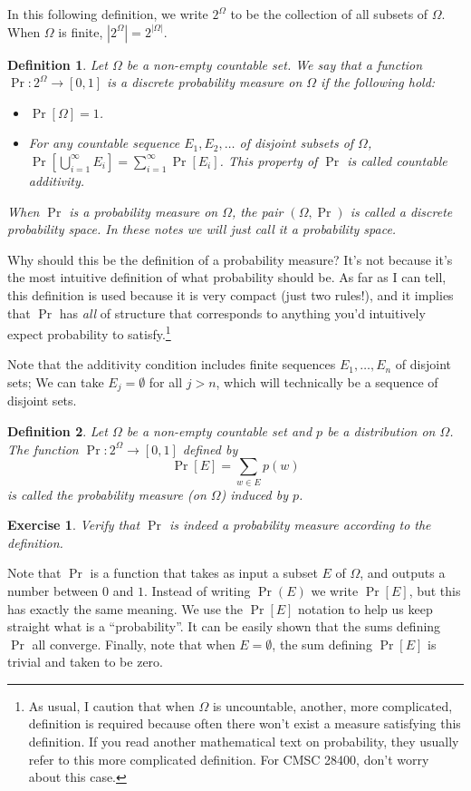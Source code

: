 \documentclass[11pt]{article}
\newtheorem{exercise}{Exercise}
\newtheorem{definition}{Definition}
\begin{document}
In this following definition, we write $2^\Omega$ to be the collection of
all subsets of $\Omega$. When $\Omega$ is finite, $|2^\Omega| = 2^{|\Omega|}$.
\begin{definition}
    Let $\Omega$ be a non-empty countable set. We say that a function
    $\Pr:2^\Omega \to [0,1]$ is a \emph{discrete probability measure on
    $\Omega$} if the following hold:
    \begin{itemize}
        \item $\Pr[\Omega] = 1$.
        \item For any countable sequence 
            $E_1,E_2,\ldots$ of disjoint subsets of $\Omega$,
            $\Pr[\bigcup_{i=1}^\infty E_i] = \sum_{i=1}^\infty\Pr[E_i]$.
            This property of $\Pr$ is called \emph{countable additivity}.
    \end{itemize}
    When $\Pr$ is a probability measure on $\Omega$, 
    the pair $(\Omega,\Pr)$ is called a \emph{discrete probability space}.
    In these notes we will just call it a \emph{probability space}.
\end{definition}
Why should this be the definition of a probability measure? It's not because
it's the most intuitive definition of what probability should be. As far as
I can tell, this definition is used because it is very compact (just two
rules!), and it implies that $\Pr$ has \emph{all} of structure that
corresponds to anything you'd intuitively expect probability to
satisfy.\footnote{ As usual, I caution that when $\Omega$ is uncountable,
another, more complicated, definition is required because often there won't
exist a measure satisfying this definition. If you read another mathematical
text on probability, they usually refer to this more complicated
definition. For CMSC 28400, don't worry about
this case.}

Note that the additivity condition includes finite 
sequences $E_1,\ldots,E_n$ of disjoint sets; We can take $E_j=\emptyset$
for all $j>n$, which will technically be a sequence of disjoint sets.

\begin{definition}
    Let $\Omega$ be a non-empty countable set and $p$ be a distribution on
    $\Omega$. 
    The function $\Pr:2^\Omega \to [0,1]$ defined by
    \[
        \Pr[E] = \sum_{w\in E}p(w)
    \]
    is called \emph{the probability measure (on $\Omega$) induced by $p$}.
\end{definition}
\begin{exercise}
    Verify that $\Pr$ is indeed a probability measure according to the
    definition.
\end{exercise}
Note that $\Pr$ is a function that takes as input a subset $E$ of $\Omega$,
and outputs a number between $0$ and $1$. Instead of writing $\Pr(E)$ we write
$\Pr[E]$, but this has exactly the same meaning. We use the $\Pr[E]$ notation
to help us keep straight what is a ``probability''.   
It can be easily shown that the sums defining $\Pr$ all converge.
Finally, note that
when $E=\emptyset$, the sum defining $\Pr[E]$ is trivial and taken to be zero.
\end{document}
